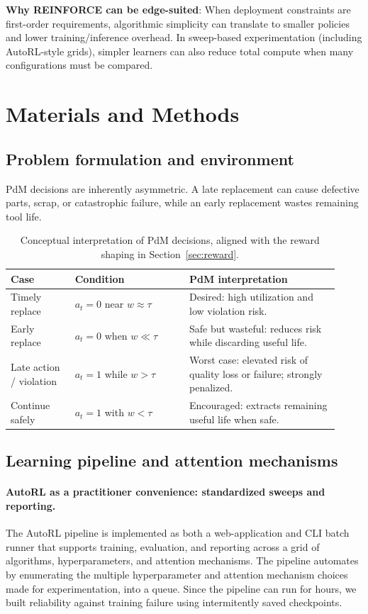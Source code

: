\documentclass[sn-basic]{sn-jnl} %
\begin{document}
\textbf{Why REINFORCE can be edge-suited}: When deployment constraints are first-order requirements, algorithmic simplicity can translate to smaller policies and lower training/inference overhead. In sweep-based experimentation (including AutoRL-style grids), simpler learners can also reduce total compute when many configurations must be compared. 

\section{Materials and Methods}
\label{sec:method}
\subsection{Problem formulation and environment}
\label{sec:problem}
\label{sec:env}
\label{sec:reward}
PdM decisions are inherently asymmetric. A late replacement can cause defective parts, scrap, or catastrophic failure, while an early replacement wastes remaining tool life.

\begin{table}[t]
	\centering
	\caption{Conceptual interpretation of PdM decisions, aligned with the reward shaping in Section~\ref{sec:reward}.}
	\label{tab:cost_view}
	\begin{tabular}{p{0.18\linewidth} p{0.32\linewidth} p{0.42\linewidth}}
		\toprule
		\textbf{Case} & \textbf{Condition} & \textbf{PdM interpretation}\\
		\midrule
		Timely replace & $a_t=0$ near $w\approx\tau$ & Desired: high utilization and low violation risk.\\
		Early replace & $a_t=0$ when $w\ll\tau$ & Safe but wasteful: reduces risk while discarding useful life.\\
		Late action / violation & $a_t=1$ while $w>\tau$ & Worst case: elevated risk of quality loss or failure; strongly penalized.\\
		Continue safely & $a_t=1$ with $w<\tau$ & Encouraged: extracts remaining useful life when safe.\\
		\bottomrule
	\end{tabular}
\end{table}

\subsection{Learning pipeline and attention mechanisms}\label{sec:algo_desc}
\paragraph{AutoRL as a practitioner convenience: standardized sweeps and reporting.}\label{sec:autorl}
The AutoRL pipeline is implemented as both a web-application and CLI batch runner that supports training, evaluation, and reporting across a grid of algorithms, hyperparameters, and attention mechanisms. The pipeline automates by enumerating the multiple hyperparameter and attention mechanism choices made for experimentation, into a queue. Since the pipeline can run for hours, we built reliability against training failure using intermitently saved checkpoints.
\end{document}
